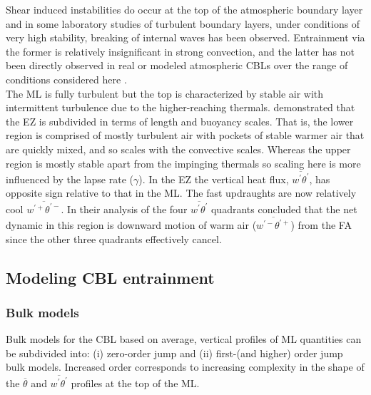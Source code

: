 Shear induced instabilities do occur at the top of the atmospheric boundary layer and in some laboratory studies of turbulent boundary layers, under conditions of very high stability, breaking of internal waves has been observed.  Entrainment via the former is relatively insignificant in strong convection, and the latter has not been directly observed in real or modeled atmospheric CBLs over the range of conditions considered here \citep{Traum11, SullMoengStev}.\\

The ML is fully turbulent but the top is characterized by stable air with intermittent turbulence due to the higher-reaching thermals. \cite{GarciaMellado} demonstrated that the EZ is subdivided in terms of length and buoyancy scales.  That is, the lower region is comprised of mostly turbulent air with pockets of stable warmer air that are quickly mixed, and so scales with the convective scales. Whereas the upper region is mostly stable apart from the impinging thermals so scaling here is more influenced by the lapse rate ($\gamma$).  In the EZ the vertical heat flux, $\overline{w^{'}\theta^{'}}$, has opposite sign relative to that in the ML.  The fast updraughts are now relatively cool $\overline{w^{'+}\theta^{'-}}$.  In their analysis of the four $\overline{w^{'}\theta^{'}}$ quadrants \cite{SullMoengStev} concluded that the net dynamic in this region is downward motion of warm air ($\overline{w^{'-}\theta^{'+}}$) from the FA since the other three quadrants effectively cancel.\\

\subsection{Modeling CBL entrainment}

\subsubsection{Bulk models}
\label{subsubsec:bulkmod}

Bulk  models for the CBL based on average, vertical profiles of ML quantities can be subdivided into: (i) zero-order jump and (ii) first-(and higher) order jump bulk models.  Increased order corresponds to increasing complexity in the shape of the  $\overline{\theta}$ and $\overline{w^{'}\theta^{'}}$ profiles at the top of the ML.\\
 
